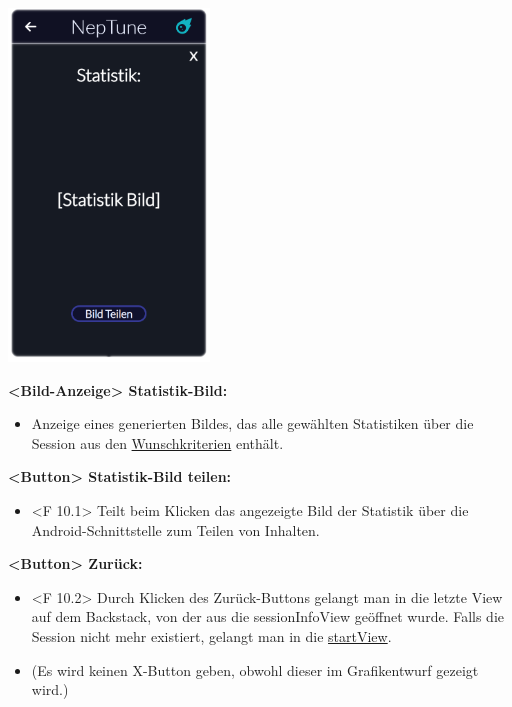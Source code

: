 \documentclass[oneside, ngerman]{sdqtechreport}
\begin{document}
\begin{center}
    \hypertarget{sessionStatsView}{}
    \includegraphics[width=0.4\textwidth]{LATEX/Pflichtenheft/GraphicDesigns/statisticsPopUpPage.png}
\end{center}

\textbf{<Bild-Anzeige> Statistik-Bild:}
\begin{itemize}
    \item Anzeige eines generierten Bildes, das alle gewählten Statistiken über die Session aus den \hyperlink{Wunschkriterien}{Wunschkriterien} enthält.
\end{itemize}

\textbf{<Button> Statistik-Bild teilen:}
\begin{itemize}
    \hypertarget{<F 10.1>}{}
    \item <F 10.1> Teilt beim Klicken das angezeigte Bild der Statistik über die Android-Schnittstelle zum Teilen von Inhalten.
\end{itemize}

\textbf{<Button> Zurück:}
\begin{itemize}
    \hypertarget{<F 10.2>}{}
    \item <F 10.2> Durch Klicken des Zurück-Buttons gelangt man in die letzte View auf dem Backstack, von der aus die sessionInfoView geöffnet wurde. Falls die Session nicht mehr existiert, gelangt man in die \hyperlink{startView}{startView}.
    \item (Es wird keinen X-Button geben, obwohl dieser im Grafikentwurf gezeigt wird.)
\end{itemize}
\end{document}
